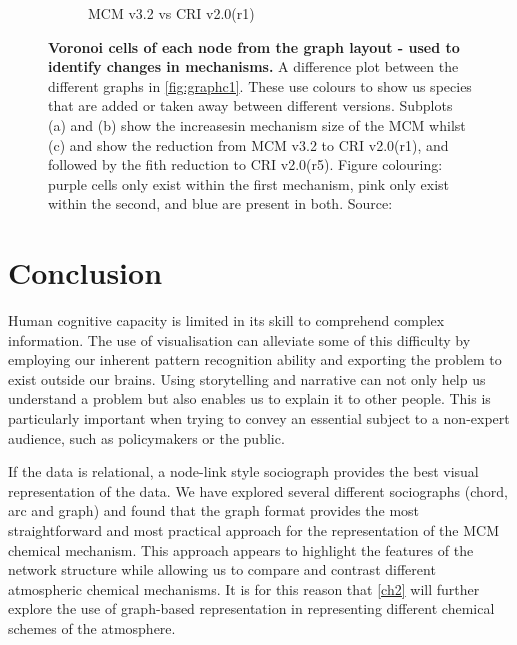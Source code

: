 \begin{figure}[H]
\begin{subfigure}[b]{.49\textwidth}
         \caption{MCM v3.2 vs CRI v2.0(r1)}
         \label{fig:ts}
     \end{subfigure}
      \hfill
        \caption{ \textbf{Voronoi cells of each node from the graph layout - used to identify changes in mechanisms.} A difference plot between the different graphs in \autoref{fig:graphc1}. These use colours to show us species that are added or taken away between different versions. Subplots (a) and (b) show the increasesin mechanism size of the MCM whilst (c) and show the reduction from MCM v3.2 to CRI v2.0(r1), and followed by the fith reduction to CRI v2.0(r5).  
        Figure colouring: purple cells only exist within the first mechanism, pink only exist within the second, and blue are present in both.  Source: \cite{mcmblue}}
        \label{fig:mcmchange}
\end{figure}







%
%



\section{Conclusion}

Human cognitive capacity is limited in its skill to comprehend complex information. The use of visualisation can alleviate some of this difficulty by employing our inherent pattern recognition ability and exporting the problem to exist outside our brains. Using storytelling and narrative can not only help us understand a problem but also enables us to explain it to other people. This is particularly important when trying to convey an essential subject to a non-expert audience, such as policymakers or the public.

If the data is relational, a node-link style sociograph provides the best visual representation of the data. We have explored several different sociographs (chord, arc and graph) and found that the graph format provides the most straightforward and most practical approach for the representation of the MCM chemical mechanism. This approach appears to highlight the features of the network structure while allowing us to compare and contrast different atmospheric chemical mechanisms. It is for this reason that \autoref{ch2} will further explore the use of graph-based representation in representing different chemical schemes of the atmosphere.
